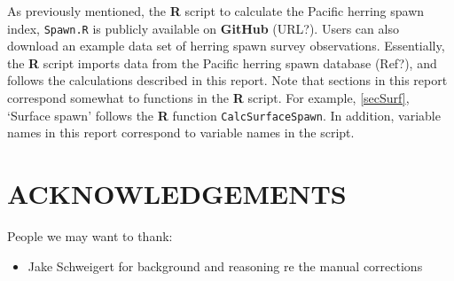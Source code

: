 \documentclass[12pt]{article}
\begin{document}
As previously mentioned, the \textbf{R} script to calculate the Pacific herring spawn index, \texttt{Spawn.R} is publicly available on \textbf{GitHub} (URL?).
Users can also download an example data set of herring spawn survey observations.
Essentially, the \textbf{R} script imports data from the Pacific herring spawn database (Ref?), and follows the calculations described in this report.
Note that sections in this report correspond somewhat to functions in the \textbf{R} script.
For example, \autoref{secSurf}, `Surface spawn' follows the \textbf{R} function \texttt{CalcSurfaceSpawn}.
In addition, variable names in this report correspond to variable names in the script.

\section{ACKNOWLEDGEMENTS}

People we may want to thank:
\begin{itemize}
\item Jake Schweigert for background and reasoning re the manual corrections
\end{itemize}



\end{document}
